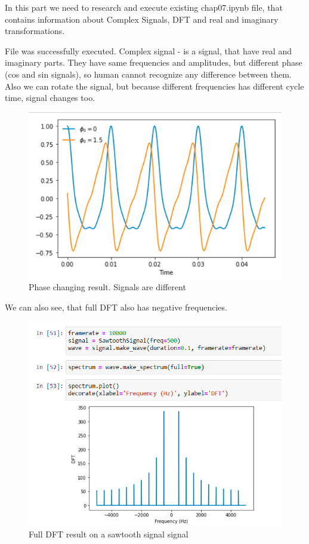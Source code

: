 \documentclass[a4paper]{article}
\begin{document}
        In this part we need to research and execute existing chap07.ipynb file, that contains information about Complex Signals, DFT and real and imaginary transformations.
        
        File was successfully executed. Complex signal - is a signal, that have real and imaginary parts. They have same frequencies and amplitudes, but different phase (cos and sin signals), so human cannot recognize any difference between them. Also we can rotate the signal, but because different frequencies has different cycle time, signal changes too.
        
        \begin{figure}[H]
            \centering
            \includegraphics[width=\textwidth]{img/p1_2.png}
            \caption{Phase changing result. Signals are different}
            \label{fig:p1_2}
        \end{figure}
        
        We can also see, that full DFT also has negative frequencies.
        
        \begin{figure}[H]
            \centering
            \includegraphics[width=\textwidth]{img/p1_1.png}
            \caption{Full DFT result on a sawtooth signal signal}
            \label{fig:p1_1}
        \end{figure}
        
\end{document}
